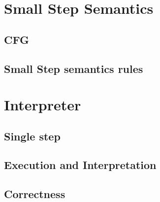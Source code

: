 \section{Small Step Semantics}\label{section:small_step}

\subsection{CFG}\label{subsection:cfg}
\subsection{Small Step semantics rules}\label{subsection:rules_small_step}

\section{Interpreter}\label{section:interpreter}

\subsection{Single step}\label{subsection:single_step}
\subsection{Execution and Interpretation}\label{subsection:exec_interp}
\subsection{Correctness}\label{subsection:correctness}
